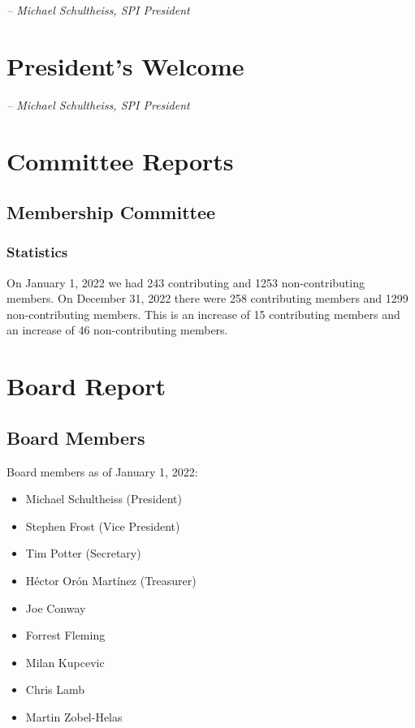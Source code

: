 \documentclass[a4paper]{report}
\begin{document}
  \emph{-- Michael Schultheiss, SPI President}

\newpage

\tableofcontents

\newpage

\chapter{President's Welcome}
\label{sec:president}

  \emph{-- Michael Schultheiss, SPI President}

\chapter{Committee Reports}
\section{Membership Committee}

\subsection{Statistics}

On January 1, 2022 we had 243 contributing and 1253 non-contributing members.  On December 31, 2022 there were 258 contributing members and 1299 non-contributing members.  This is an increase of 15 contributing members and an increase of 46 non-contributing members.

\chapter{Board Report}
\section{Board Members}

Board members as of January 1, 2022:

\begin{itemize}
\item Michael Schultheiss (President)
\item Stephen Frost (Vice President)
\item Tim Potter (Secretary)
\item Héctor Orón Martínez (Treasurer)
\item Joe Conway
\item Forrest Fleming
\item Milan Kupcevic
\item Chris Lamb
\item Martin Zobel-Helas
\end{itemize}
\end{document}
